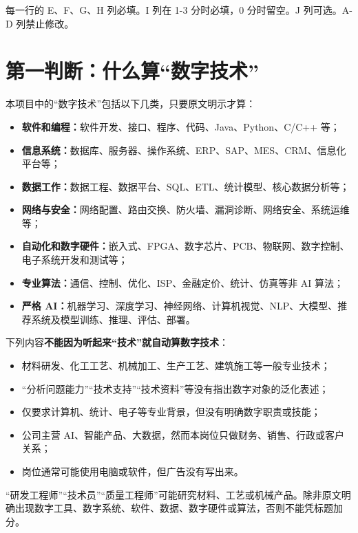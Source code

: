 \documentclass[11pt,a4paper,fontset=none]{ctexart}
\begin{document}
\begin{keybox}[哪些列必填]
每一行的 E、F、G、H 列必填。I 列在 1-3 分时必填，0 分时留空。J 列可选。A-D 列禁止修改。
\end{keybox}

\section{第一判断：什么算“数字技术”}

本项目中的“数字技术”包括以下几类，只要原文明示才算：

\begin{itemize}
  \item \textbf{软件和编程：}软件开发、接口、程序、代码、Java、Python、C/C++ 等；
  \item \textbf{信息系统：}数据库、服务器、操作系统、ERP、SAP、MES、CRM、信息化平台等；
  \item \textbf{数据工作：}数据工程、数据平台、SQL、ETL、统计模型、核心数据分析等；
  \item \textbf{网络与安全：}网络配置、路由交换、防火墙、漏洞诊断、网络安全、系统运维等；
  \item \textbf{自动化和数字硬件：}嵌入式、FPGA、数字芯片、PCB、物联网、数字控制、电子系统开发和测试等；
  \item \textbf{专业算法：}通信、控制、优化、ISP、金融定价、统计、仿真等非 AI 算法；
  \item \textbf{严格 AI：}机器学习、深度学习、神经网络、计算机视觉、NLP、大模型、推荐系统及模型训练、推理、评估、部署。
\end{itemize}

下列内容\textbf{不能因为听起来“技术”就自动算数字技术}：

\begin{itemize}
  \item 材料研发、化工工艺、机械加工、生产工艺、建筑施工等一般专业技术；
  \item “分析问题能力”“技术支持”“技术资料”等没有指出数字对象的泛化表述；
  \item 仅要求计算机、统计、电子等专业背景，但没有明确数字职责或技能；
  \item 公司主营 AI、智能产品、大数据，然而本岗位只做财务、销售、行政或客户关系；
  \item 岗位通常可能使用电脑或软件，但广告没有写出来。
\end{itemize}

\begin{warningbox}
“研发工程师”“技术员”“质量工程师”可能研究材料、工艺或机械产品。除非原文明确出现数字工具、数字系统、软件、数据、数字硬件或算法，否则不能凭标题加分。
\end{warningbox}
\end{document}
